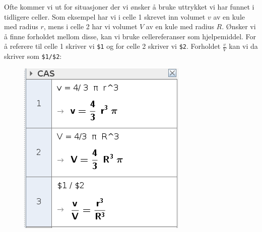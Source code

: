 Ofte kommer vi ut for situasjoner der vi ønsker å bruke uttrykket vi har funnet i tidligere celler. Som eksempel har vi i celle 1 skrevet inn volumet $ v $ av en kule med radius $ r $, mens i celle 2 har vi volumet $ V $ av en kule med radius $ R $. Ønsker vi å finne forholdet mellom disse, kan vi bruke cellereferanser som hjelpemiddel. For å referere til celle 1 skriver vi \texttt{\$1} og for celle 2 skriver vi \texttt{\$2}. Forholdet $ \frac{v}{V} $ kan vi da skriver som \texttt{\$1/\$2}:
\begin{figure}
	\centering
	\includegraphics[scale=0.5]{fig/ref}
\end{figure}

